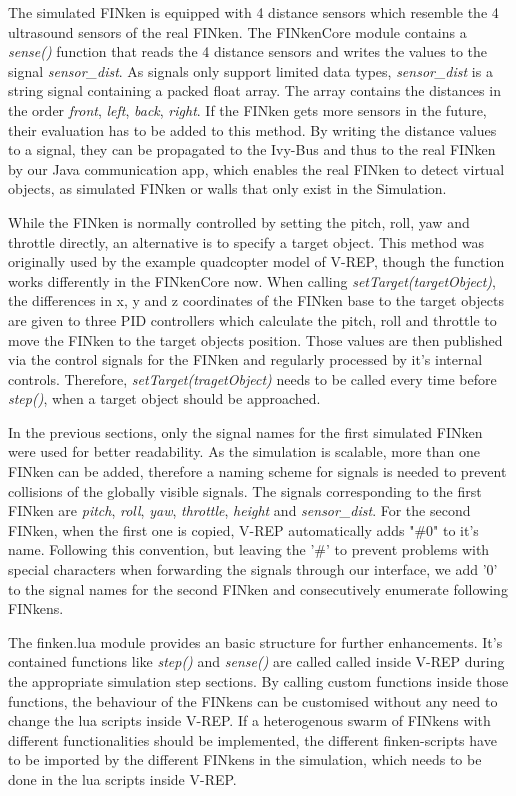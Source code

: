 The simulated FINken is equipped with 4 distance sensors which resemble the 4 ultrasound sensors of the real FINken. The FINkenCore module contains a \textit{sense()} function that reads the 4 distance sensors and writes the values to the signal \textit{sensor\_dist}. As signals only support limited data types, \textit{sensor\_dist} is a string signal containing a packed float array. The array contains the distances in the order \textit{front}, \textit{left}, \textit{back}, \textit{right}.  If the FINken gets more sensors in the future, their evaluation has to be added to this method.
By writing the distance values to a signal, they can be propagated to the Ivy-Bus and thus to the real FINken by our Java communication app, which enables the real FINken to detect virtual objects, as simulated FINken or walls that only exist in the Simulation.


While the FINken is normally controlled by setting the pitch, roll, yaw and throttle directly, an alternative is to specify a target object. This method was originally used by the example quadcopter model of V-REP, though the function works differently in the FINkenCore now. When calling  \textit{setTarget(targetObject)}, the differences in x, y and z coordinates of the FINken base to the target objects are given to three \gls{PID} controllers which calculate the pitch, roll and throttle to move the FINken to the target objects position. Those values are then published via the control signals for the FINken and regularly processed by it's internal controls. Therefore, \textit{setTarget(tragetObject)} needs to be called every time before \textit{step()}, when a target object should be approached.

In the previous sections, only the signal names for the first simulated FINken were used for better readability. As the simulation is scalable, more than one FINken can be added, therefore a naming scheme for signals is needed to prevent collisions of the globally visible signals. The signals corresponding to the first FINken are \textit{pitch}, \textit{roll}, \textit{yaw}, \textit{throttle}, \textit{height} and \textit{sensor\_dist}. For the second FINken, when the first one is copied, V-REP automatically adds "\#0" to it's name. Following this convention, but leaving the '\#' to prevent problems with special characters when forwarding the signals through our interface, we add '0' to the signal names for the second FINken and consecutively enumerate following FINkens.

The finken.lua module provides an basic structure for further enhancements. It's contained functions like \textit{step()} and \textit{sense()} are called called inside V-REP during the appropriate simulation step sections. By calling custom functions inside those functions, the behaviour of the FINkens can be customised without any need to change the lua scripts inside V-REP. If a heterogenous swarm of FINkens with different functionalities should be implemented, the different finken-scripts have to be imported by the different FINkens in the simulation, which needs to be done in the lua scripts inside V-REP.


